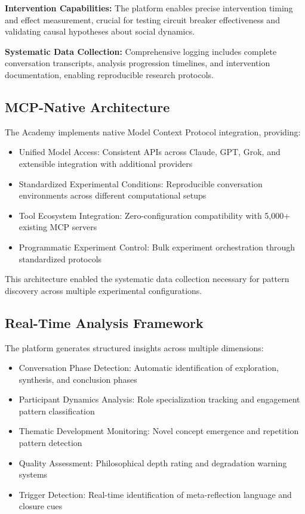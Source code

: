 \documentclass[11pt,letterpaper]{article}
\newcommand{\theacademy}{The Academy}
\begin{document}
\textbf{Intervention Capabilities:} The platform enables precise intervention timing and effect measurement, crucial for testing circuit breaker effectiveness and validating causal hypotheses about social dynamics.

\textbf{Systematic Data Collection:} Comprehensive logging includes complete conversation transcripts, analysis progression timelines, and intervention documentation, enabling reproducible research protocols.

\subsection{MCP-Native Architecture}

\theacademy{} implements native Model Context Protocol integration, providing:

\begin{itemize}
    \item Unified Model Access: Consistent APIs across Claude, GPT, Grok, and extensible integration with additional providers
    \item Standardized Experimental Conditions: Reproducible conversation environments across different computational setups
    \item Tool Ecosystem Integration: Zero-configuration compatibility with 5,000+ existing MCP servers
    \item Programmatic Experiment Control: Bulk experiment orchestration through standardized protocols
\end{itemize}

This architecture enabled the systematic data collection necessary for pattern discovery across multiple experimental configurations.

\subsection{Real-Time Analysis Framework}

The platform generates structured insights across multiple dimensions:

\begin{itemize}
    \item Conversation Phase Detection: Automatic identification of exploration, synthesis, and conclusion phases
    \item Participant Dynamics Analysis: Role specialization tracking and engagement pattern classification
    \item Thematic Development Monitoring: Novel concept emergence and repetition pattern detection
    \item Quality Assessment: Philosophical depth rating and degradation warning systems
    \item Trigger Detection: Real-time identification of meta-reflection language and closure cues
\end{itemize}
\end{document}
